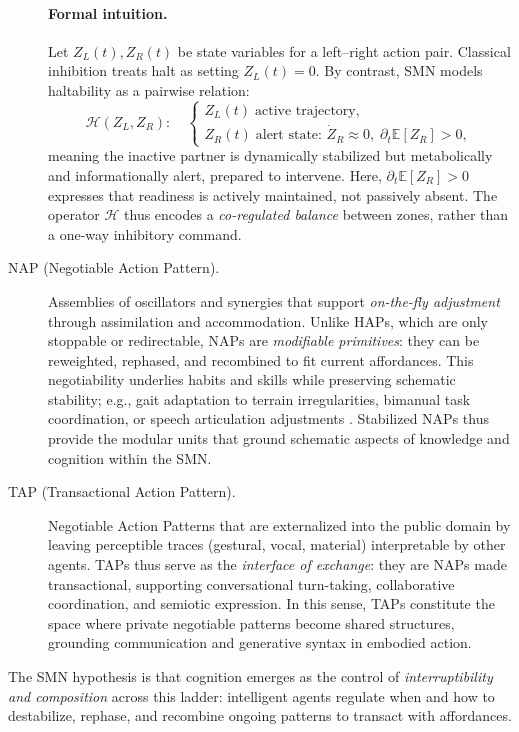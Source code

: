 \begin{description}
\paragraph{Formal intuition.} Let $Z_L(t), Z_R(t)$ be state variables for a left–right action pair.  Classical inhibition treats halt as setting $Z_L(t)=0$.  By contrast, SMN models haltability as a pairwise relation: \[ \mathcal{H}(Z_L,Z_R):\quad  
\begin{cases} Z_L(t) \;\text{active trajectory}, \\ Z_R(t) \;\text{alert state: } \dot{Z}_R \approx 0,\; \partial_t \mathbb{E}[Z_R]>0, \end{cases} \] 
meaning the inactive partner is dynamically stabilized but metabolically and informationally alert, prepared to intervene.  Here, $\partial_t \mathbb{E}[Z_R]>0$ expresses that readiness is actively maintained, not passively absent.  The operator $\mathcal{H}$ thus encodes a \emph{co-regulated balance} between zones, rather than a one-way inhibitory command.    
\item[NAP (Negotiable Action Pattern).]  Assemblies of oscillators and synergies that support \emph{on-the-fly adjustment} through assimilation and accommodation.  Unlike HAPs, which are only stoppable or redirectable, NAPs are \emph{modifiable primitives}: they can be reweighted, rephased, and recombined to fit current affordances.  This negotiability underlies habits and skills while preserving schematic stability; e.g., gait adaptation to terrain irregularities, bimanual task coordination, or speech articulation adjustments \citep{HakenKelsoBunz1985,Kelso1995,BizziCheung2013}.  Stabilized NAPs thus provide the modular units that ground schematic aspects of knowledge and cognition within the SMN.  
\item[TAP (Transactional Action Pattern).]  Negotiable Action Patterns that are externalized into the public domain by leaving perceptible traces (gestural, vocal, material) interpretable by other agents.  TAPs thus serve as the \emph{interface of exchange}: they are NAPs made transactional, supporting conversational turn-taking, collaborative coordination, and semiotic expression.  In this sense, TAPs constitute the space where private negotiable patterns become shared structures, grounding communication and generative syntax in embodied action.  \end{description} 

The SMN hypothesis is that cognition emerges as the control of \emph{interruptibility and composition} across this ladder: intelligent agents regulate when and how to destabilize, rephase, and recombine ongoing patterns to transact with affordances.  

